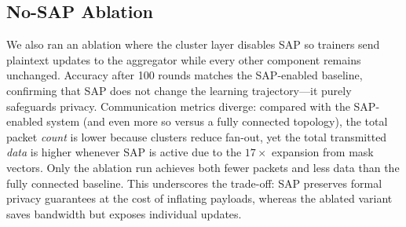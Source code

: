 \subsection{No-SAP Ablation}
\label{sec:no-sap-ablation}

We also ran an ablation where the cluster layer disables SAP so trainers send plaintext updates to the aggregator while every other component remains unchanged. Accuracy after 100 rounds matches the SAP-enabled baseline, confirming that SAP does not change the learning trajectory—it purely safeguards privacy. Communication metrics diverge: compared with the SAP-enabled system (and even more so versus a fully connected topology), the total packet \emph{count} is lower because clusters reduce fan-out, yet the total transmitted \emph{data} is higher whenever SAP is active due to the $17\times$ expansion from mask vectors. Only the ablation run achieves both fewer packets and less data than the fully connected baseline. This underscores the trade-off: SAP preserves formal privacy guarantees at the cost of inflating payloads, whereas the ablated variant saves bandwidth but exposes individual updates.
